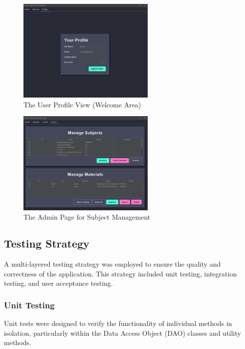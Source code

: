 \documentclass[12pt, a4paper]{report}
\begin{document}
\begin{figure}[h!]
    \centering
    \includegraphics[width=0.6\textwidth]{new_images_note/profile_page.png}
    \caption{The User Profile View (Welcome Area)}
    \label{fig:profile_page}
\end{figure}

\begin{figure}[h!]
    \centering
    \includegraphics[width=0.6\textwidth]{new_images_note/admin_page.png}
    \caption{The Admin Page for Subject Management}
    \label{fig:admin_page}
\end{figure}

\subsection{Testing Strategy}
A multi-layered testing strategy was employed to ensure the quality and correctness of the application. This strategy included unit testing, integration testing, and user acceptance testing.

\subsubsection{Unit Testing}
Unit tests were designed to verify the functionality of individual methods in isolation, particularly within the Data Access Object (DAO) classes and utility methods.
\end{document}

